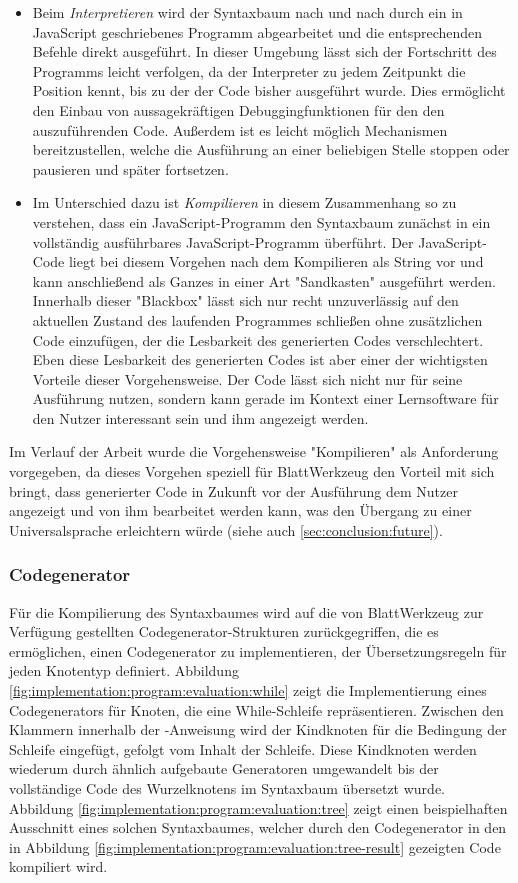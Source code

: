 \begin{itemize}
  \item Beim \emph{Interpretieren} wird der Syntaxbaum nach und nach durch ein in JavaScript geschriebenes Programm abgearbeitet und die entsprechenden Befehle direkt ausgeführt. In dieser Umgebung lässt sich der Fortschritt des Programms leicht verfolgen, da der Interpreter zu jedem Zeitpunkt die Position kennt, bis zu der der Code bisher ausgeführt wurde. Dies ermöglicht den Einbau von aussagekräftigen Debuggingfunktionen für den den auszuführenden Code. Außerdem ist es leicht möglich Mechanismen bereitzustellen, welche die Ausführung an einer beliebigen Stelle stoppen oder pausieren und später fortsetzen.
  \item Im Unterschied dazu ist \emph{Kompilieren} in diesem Zusammenhang so zu verstehen, dass ein JavaScript-Programm den Syntaxbaum zunächst in ein vollständig ausführbares JavaScript-Programm überführt. Der JavaScript-Code liegt bei diesem Vorgehen nach dem Kompilieren als String vor und kann anschließend als Ganzes in einer Art "Sandkasten" ausgeführt werden. Innerhalb dieser "Blackbox" lässt sich nur recht unzuverlässig auf den aktuellen Zustand des laufenden Programmes schließen ohne zusätzlichen Code einzufügen, der die Lesbarkeit des generierten Codes verschlechtert. Eben diese Lesbarkeit des generierten Codes ist aber einer der wichtigsten Vorteile dieser Vorgehensweise. Der Code lässt sich nicht nur für seine Ausführung nutzen, sondern kann gerade im Kontext einer Lernsoftware für den Nutzer interessant sein und ihm angezeigt werden.
\end{itemize}

Im Verlauf der Arbeit wurde die Vorgehensweise "Kompilieren" als Anforderung vorgegeben, da dieses Vorgehen speziell für BlattWerkzeug den Vorteil mit sich bringt, dass generierter Code in Zukunft vor der Ausführung dem Nutzer angezeigt und von ihm bearbeitet werden kann, was den Übergang zu einer Universalsprache erleichtern würde (siehe auch \ref{sec:conclusion:future}).

\subsubsection{Codegenerator}

Für die Kompilierung des Syntaxbaumes wird auf die von BlattWerkzeug zur Verfügung gestellten Codegenerator-Strukturen zurückgegriffen, die es ermöglichen, einen Codegenerator zu implementieren, der Übersetzungsregeln für jeden Knotentyp definiert. Abbildung \ref{fig:implementation:program:evaluation:while} zeigt die Implementierung eines Codegenerators für Knoten, die eine While-Schleife repräsentieren. Zwischen den Klammern innerhalb der -Anweisung wird der Kindknoten für die Bedingung der Schleife eingefügt, gefolgt vom Inhalt der Schleife. Diese Kindknoten werden wiederum durch ähnlich aufgebaute Generatoren umgewandelt bis der vollständige Code des Wurzelknotens im Syntaxbaum übersetzt wurde. Abbildung \ref{fig:implementation:program:evaluation:tree} zeigt einen beispielhaften Ausschnitt eines solchen Syntaxbaumes, welcher durch den Codegenerator in den in Abbildung \ref{fig:implementation:program:evaluation:tree-result} gezeigten Code kompiliert wird.

